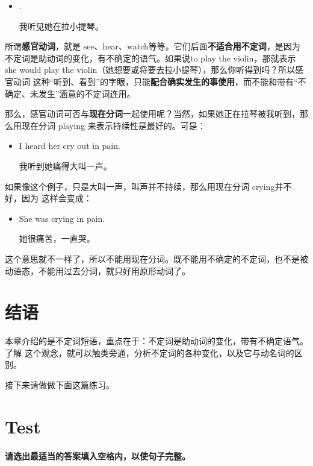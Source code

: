 \begin{itemize}
\item {}   .

  我听见她在拉小提琴。
\end{itemize}

所谓\textbf{感官动词}，就是 see、hear、watch等等。它们后面\textbf{不适合用不定词}，是因为
不定词是助动词的变化，有不确定的语气。如果说to play the violin，那就表示 she
would play the violin（她想要或将要去拉小提琴），那么你听得到吗？所以感官动词
这种“听到、看到”的字眼，只能\textbf{配合确实发生的事使用}，而不能和带有“不
确定、未发生”涵意的不定词连用。

那么，感官动词可否与\textbf{现在分词}一起使用呢？当然，如果她正在拉琴被我听到，那么用现在分词
playing 来表示持续性是最好的。可是：
\begin{itemize}
\item  I heard her cry out in pain.

  我听到她痛得大叫一声。
\end{itemize}

如果像这个例子，只是大叫一声，叫声并不持续，那么用现在分词 crying并不好，因为
这样会变成：
\begin{itemize}
\item She was crying in pain.

  她很痛苦，一直哭。
\end{itemize}
这个意思就不一样了，所以不能用现在分词。既不能用不确定的不定词，也不是被动语态，不能用过去分词，就只好用原形动词了。

\section{结语}

本章介绍的是不定词短语，重点在于：不定词是助动词的变化，带有不确定语气。了解
这个观念，就可以触类旁通，分析不定词的各种变化，以及它与动名词的区别。

接下来请做做下面这篇练习。

\section{Test}

\paragraph{请选出最适当的答案填入空格内，以使句子完整。}

